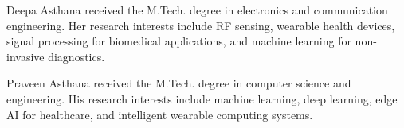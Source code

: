 \documentclass[journal,twoside]{IEEEtran}
\begin{document}
\balance

\begin{IEEEbiography}[]{Deepa Asthana}
received the M.Tech. degree in electronics and communication engineering. Her research interests include RF sensing, wearable health devices, signal processing for biomedical applications, and machine learning for non-invasive diagnostics.
\end{IEEEbiography}

\begin{IEEEbiography}[]{Praveen Asthana}
received the M.Tech. degree in computer science and engineering. His research interests include machine learning, deep learning, edge AI for healthcare, and intelligent wearable computing systems.
\end{IEEEbiography}
\end{document}
